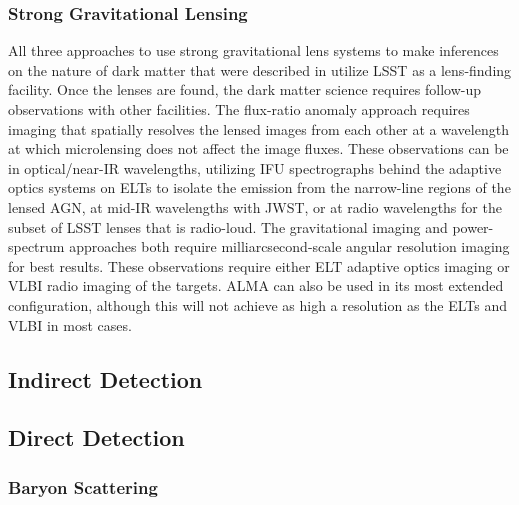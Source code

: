 \subsubsection{Strong Gravitational Lensing}
\label{sec:SLcomplement}

All three approaches to use strong gravitational lens systems to make inferences on the nature of dark matter that were described in  utilize LSST as a lens-finding facility.
Once the lenses are found, the dark matter science requires follow-up observations with other facilities.
The flux-ratio anomaly approach requires imaging that spatially resolves the lensed images from each other at a wavelength at which microlensing does not affect the image fluxes.
These observations can be in optical/near-IR wavelengths, utilizing IFU spectrographs behind the adaptive optics systems on ELTs to isolate the emission from the narrow-line regions of the lensed AGN, at mid-IR wavelengths with JWST, or at radio wavelengths for the subset of LSST lenses that is radio-loud.
The gravitational imaging and power-spectrum approaches both require milliarcsecond-scale angular resolution imaging for best results.
These observations require either ELT adaptive optics imaging or VLBI radio imaging of the targets.
ALMA can also be used in its most extended configuration, although this will not achieve as high a resolution as the ELTs and VLBI in most cases.

\subsection{Indirect Detection }



\subsection{Direct Detection }

\subsubsection{Baryon Scattering }

